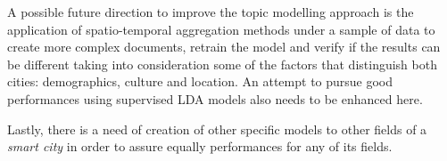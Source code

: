 A possible future direction to improve the topic modelling approach is the application of spatio-temporal aggregation methods under a sample of data to create more complex documents, retrain the model and verify if the results can be different taking into consideration some of the factors that distinguish both cities: demographics, culture and location. An attempt to pursue good performances using supervised LDA models also needs to be enhanced here.

Lastly, there is a need of creation of other specific models to other fields of a \textit{smart city} in order to assure equally performances for any of its fields.
